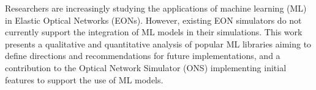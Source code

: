 Researchers are increasingly studying the applications of machine learning (ML) in Elastic Optical Networks (EONs). However, existing EON simulators do not currently support the integration of ML models in their simulations. This work presents a qualitative and quantitative analysis of popular ML libraries aiming to define directions and recommendations for future implementations, and a contribution to the Optical Network Simulator (ONS) implementing initial features to support the use of ML models.